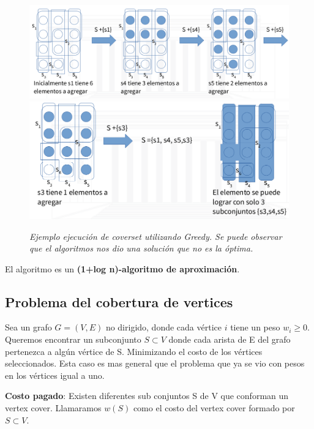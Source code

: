 \documentclass{article}
\begin{document}
\newpage
\begin{figure}[h!]
    \begin{center} 
    \includegraphics[width=\linewidth]{imagenes/ejemplo-problema-aprox-coverset1.png}
    \includegraphics[scale=0.3]{imagenes/ejemplo-problema-aprox-coverset2.png}
    \caption{\small \sl Ejemplo ejecución de coverset utilizando Greedy. Se puede observar que el algoritmos nos dio una solución que no es la óptima.} 
    \end{center}
\end{figure}

El algoritmo es un \textbf{(1+log n)-algoritmo de aproximación}.





\newpage
\subsection{Problema del cobertura de vertices}

Sea un grafo \(G=(V,E)\) no dirigido, donde cada vértice \(i\) tiene un peso \(w_i \geq 0\).
Queremos encontrar un subconjunto \(S \subset V\) donde cada arista de E del grafo
pertenezca a algún vértice de S.
Minimizando el costo de los vértices seleccionados.
Esta caso es mas general que el problema que ya se vio con pesos en los vértices igual a uno. 

\textbf{Costo pagado}: Existen diferentes sub conjuntos S de V que conforman un vertex cover.
Llamaramos \(w(S)\) como el costo del vertex cover formado por  \(S \subset V\).
\end{document}
